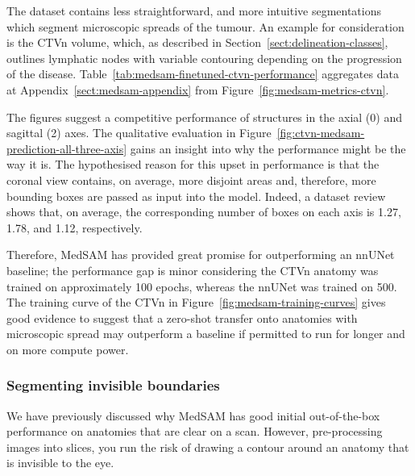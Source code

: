 \documentclass[11pt,twoside]{report}
\begin{document}
\clearpage

The dataset contains less straightforward, and more intuitive segmentations which segment microscopic spreads of the tumour. An example for consideration is the CTVn volume, which, as described in Section~\ref{sect:delineation-classes}, outlines lymphatic nodes with variable contouring depending on the progression of the disease. Table~\ref{tab:medsam-finetuned-ctvn-performance} aggregates data at Appendix~\ref{sect:medsam-appendix} from Figure~\ref{fig:medsam-metrics-ctvn}.

The figures suggest a competitive performance of structures in the axial (0) and sagittal (2) axes. The qualitative evaluation in Figure~\ref{fig:ctvn-medsam-prediction-all-three-axis} gains an insight into why the performance might be the way it is. The hypothesised reason for this upset in performance is that the coronal view contains, on average, more disjoint areas and, therefore, more bounding boxes are passed as input into the model. Indeed, a dataset review shows that, on average, the corresponding number of boxes on each axis is 1.27, 1.78, and 1.12, respectively. 

Therefore, MedSAM has provided great promise for outperforming an nnUNet baseline; the performance gap is minor considering the CTVn anatomy was trained on approximately 100 epochs, whereas the nnUNet was trained on 500. The training curve of the CTVn in Figure~\ref{fig:medsam-training-curves} gives good evidence to suggest that a zero-shot transfer onto anatomies with microscopic spread may outperform a baseline if permitted to run for longer and on more compute power. 

\subsubsection{Segmenting invisible boundaries}

We have previously discussed why MedSAM has good initial out-of-the-box performance on anatomies that are clear on a scan. However, pre-processing images into slices, you run the risk of drawing a contour around an anatomy that is invisible to the eye.
\end{document}
